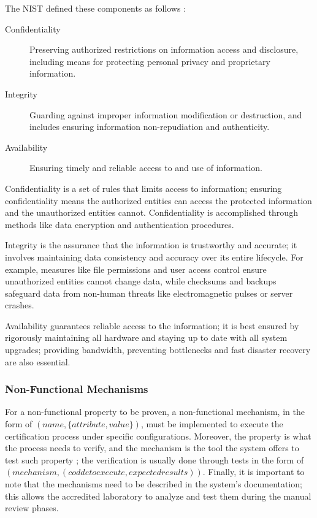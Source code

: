 The NIST defined these components as follows \cite{pub2005minimum}:
\begin{description}
    \item[Confidentiality] Preserving authorized restrictions on information access and disclosure, including means for protecting personal privacy and proprietary information.
    \item[Integrity] Guarding against improper information modification or destruction, and includes ensuring information non-repudiation and authenticity.
    \item[Availability] Ensuring timely and reliable access to and use of information.

\end{description}

Confidentiality is a set of rules that limits access to information; ensuring confidentiality means the authorized entities can access the protected information and the unauthorized entities cannot. Confidentiality is accomplished through methods like data encryption and authentication procedures.

Integrity is the assurance that the information is trustworthy and accurate; it involves maintaining data consistency and accuracy over its entire lifecycle. For example, measures like file permissions and user access control ensure unauthorized entities cannot change data, while checksums and backups safeguard data from non-human threats like electromagnetic pulses or server crashes.

Availability guarantees reliable access to the information; it is best ensured by rigorously maintaining all hardware and staying up to date with all system upgrades; providing bandwidth, preventing bottlenecks and fast disaster recovery are also essential.



\subsubsection{Non-Functional Mechanisms}
For a non-functional property to be proven, a non-functional mechanism, in the form of \( ( name, \{ attribute, value \} )\), must be implemented to execute the certification process under specific configurations. Moreover, the property is what the process needs to verify, and the mechanism is the tool the system offers to test such property \cite{anisetti2017semi}; the verification is usually done through tests in the form of \\ \( (mechanism, (codde to execute, expected results))\). Finally, it is important to note that the mechanisms need to be described in the system's documentation; this allows the accredited laboratory to analyze and test them during the manual review phases.


